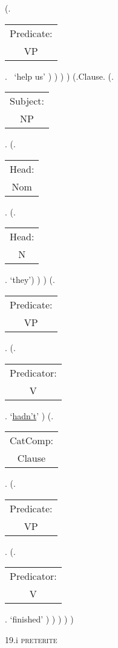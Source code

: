 \documentclass[12pt,letterpaper]{article}
\begin{document}
\begin{figure}
\begin{center}
\begin{parsetree}
			(.\begin{tabular}{c}Predicate:\\VP\end{tabular}.~ `help us' )
			)
			)
			)
			(.Clause.
			(.\begin{tabular}{c}Subject:\\NP\end{tabular}.  
			(.\begin{tabular}{c}Head:\\Nom\end{tabular}.
			(.\begin{tabular}{c}Head:\\N\end{tabular}. `they')
			)
			)
			(.\begin{tabular}{c}Predicate:\\VP\end{tabular}.
			(.\begin{tabular}{c}Predicator:\\V\end{tabular}.    `\underline{hadn't}' )
			(.\begin{tabular}{c}CatComp:\\Clause\end{tabular}. 
			(.\begin{tabular}{c}Predicate:\\VP\end{tabular}.
			(.\begin{tabular}{c}Predicator:\\V\end{tabular}.    `finished' )
			)
			)
			)
			)
			
		\end{parsetree}
		\hfill \break \hfill \break
		19.i \textsc{preterite}
	\end{center}
\end{figure}
\end{document}
